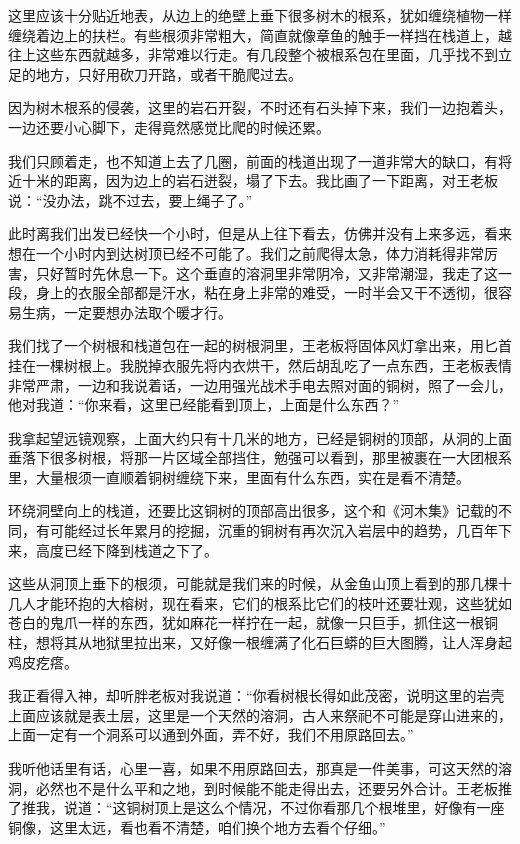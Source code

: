 这里应该十分贴近地表，从边上的绝壁上垂下很多树木的根系，犹如缠绕植物一样缠绕着边上的扶栏。有些根须非常粗大，简直就像章鱼的触手一样挡在栈道上，越往上这些东西就越多，非常难以行走。有几段整个被根系包在里面，几乎找不到立足的地方，只好用砍刀开路，或者干脆爬过去。

因为树木根系的侵袭，这里的岩石开裂，不时还有石头掉下来，我们一边抱着头，一边还要小心脚下，走得竟然感觉比爬的时候还累。

我们只顾着走，也不知道上去了几圈，前面的栈道出现了一道非常大的缺口，有将近十米的距离，因为边上的岩石迸裂，塌了下去。我比画了一下距离，对王老板说：“没办法，跳不过去，要上绳子了。”

此时离我们出发已经快一个小时，但是从上往下看去，仿佛并没有上来多远，看来想在一个小时内到达树顶已经不可能了。我们之前爬得太急，体力消耗得非常厉害，只好暂时先休息一下。这个垂直的溶洞里非常阴冷，又非常潮湿，我走了这一段，身上的衣服全部都是汗水，粘在身上非常的难受，一时半会又干不透彻，很容易生病，一定要想办法取个暖才行。

我们找了一个树根和栈道包在一起的树根洞里，王老板将固体风灯拿出来，用匕首挂在一棵树根上。我脱掉衣服先将内衣烘干，然后胡乱吃了一点东西，王老板表情非常严肃，一边和我说着话，一边用强光战术手电去照对面的铜树，照了一会儿，他对我道：“你来看，这里已经能看到顶上，上面是什么东西？”

我拿起望远镜观察，上面大约只有十几米的地方，已经是铜树的顶部，从洞的上面垂落下很多树根，将那一片区域全部挡住，勉强可以看到，那里被裹在一大团根系里，大量根须一直顺着铜树缠绕下来，里面有什么东西，实在是看不清楚。

环绕洞壁向上的栈道，还要比这铜树的顶部高出很多，这个和《河木集》记载的不同，有可能经过长年累月的挖掘，沉重的铜树有再次沉入岩层中的趋势，几百年下来，高度已经下降到栈道之下了。

这些从洞顶上垂下的根须，可能就是我们来的时候，从金鱼山顶上看到的那几棵十几人才能环抱的大榕树，现在看来，它们的根系比它们的枝叶还要壮观，这些犹如苍白的鬼爪一样的东西，犹如麻花一样拧在一起，就像一只巨手，抓住这一根铜柱，想将其从地狱里拉出来，又好像一根缠满了化石巨蟒的巨大图腾，让人浑身起鸡皮疙瘩。

我正看得入神，却听胖老板对我说道：“你看树根长得如此茂密，说明这里的岩壳上面应该就是表土层，这里是一个天然的溶洞，古人来祭祀不可能是穿山进来的，上面一定有一个洞系可以通到外面，弄不好，我们不用原路回去。”

我听他话里有话，心里一喜，如果不用原路回去，那真是一件美事，可这天然的溶洞，必然也不是什么平和之地，到时候能不能走得出去，还要另外合计。王老板推了推我，说道：“这铜树顶上是这么个情况，不过你看那几个根堆里，好像有一座铜像，这里太远，看也看不清楚，咱们换个地方去看个仔细。”

